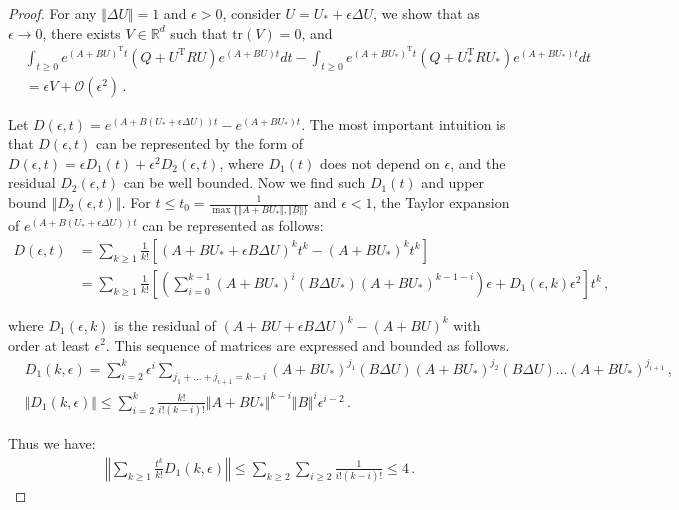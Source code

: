 \documentclass{article}
\theoremstyle{definition}
\begin{document}
\convergence*
\begin{proof}
For any $\Vert \Delta U\Vert =1$ and $\epsilon>0$, consider $U=U_{*}+\epsilon\Delta U$, we show that as $\epsilon\to 0$, there exists $V\in\mathbb{R}^{d}$ such that $\mathrm{tr}(V)=0$, and 
\begin{align*}
&\int_{t\geq 0}e^{(A+BU)^{\mathrm{T}}t}(Q+U^{\mathrm{T}}RU)e^{(A+BU)t}dt-\int_{t\geq 0}e^{(A+BU_{*})^{\mathrm{T}}t}(Q+U_{*}^{\mathrm{T}}RU_{*})e^{(A+BU_{*})t}dt\\
&=\epsilon V+\mathcal{O}(\epsilon^{2})\,.
\end{align*}

Let $D(\epsilon,t)=e^{(A+B(U_{*}+\epsilon \Delta U))t}-e^{(A+BU_{*})t}$. The most important intuition is that $D(\epsilon,t)$ can be represented by the form of $D(\epsilon,t)=\epsilon D_{1}(t)+\epsilon^{2}D_{2}(\epsilon,t)$, where $D_{1}(t)$ does not depend on $\epsilon$, and the residual $D_{2}(\epsilon,t)$ can be well bounded. Now we find such $D_{1}(t)$ and upper bound $\left\Vert D_{2}(\epsilon,t)\right\Vert$. For $t\leq t_{0}=\frac{1}{\max\{\Vert A+BU_{*}\Vert ,\Vert B\Vert \}}$ and $\epsilon<1$, the Taylor expansion of $e^{(A+B(U_{*}+\epsilon \Delta U))t}$ can be represented as follows:
\begin{align*}
D(\epsilon,t)&=\sum_{k\geq 1}\frac{1}{k!}\left[(A+BU_{*}+\epsilon B\Delta U)^{k}t^{k}-(A+BU_{*})^{k}t^{k}\right]\\
&=\sum_{k\geq 1}\frac{1}{k!}\left[\left(\sum_{i=0}^{k-1}(A+BU_{*})^{i}(B\Delta U_{*})(A+BU_{*})^{k-1-i}\right)\epsilon+D_{1}(\epsilon,k)\epsilon^{2}\right]t^{k}\,,
\end{align*}

where $D_{1}(\epsilon,k)$ is the residual of $(A+BU+\epsilon B\Delta U)^{k}-(A+BU)^{k}$ with order at least $\epsilon^{2}$. This sequence of matrices are expressed and bounded as follows.
\begin{align*}
&D_{1}(k,\epsilon)=\sum_{i=2}^{k}\epsilon^{i}\sum_{ j_{1}+...+j_{i+1}=k-i}(A+BU_{*})^{j_{1}}(B\Delta U)(A+BU_{*})^{j_{2}}(B\Delta U)...(A+BU_{*})^{j_{i+1}}\,,\\
&\Vert D_{1}(k,\epsilon)\Vert \leq \sum_{i=2}^{k} \frac{k!}{i!(k-i)!}\Vert A+BU_{*}\Vert ^{k-i}\Vert B\Vert ^{i}\epsilon^{i-2}\,.
\end{align*}

Thus we have:
\begin{align*}
\left\Vert \sum_{k\geq 1}\frac{t^{k}}{k!}D_{1}(k,\epsilon)\right\Vert \leq \sum_{k\geq 2}\sum_{i\geq 2}\frac{1}{i!(k-i)!}\leq 4\,.
\end{align*}


\end{proof}
\end{document}
